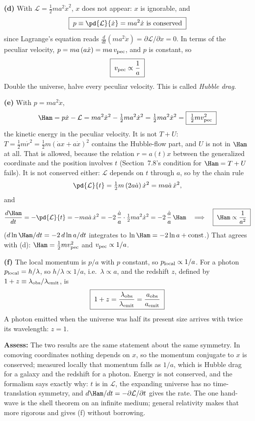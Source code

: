 \documentclass[12pt]{article}
\numberwithin{equation}{section}
\newcommand{\Lag}{\mathcal{L}}
\newcommand{\vpec}{v_{\rm pec}}
\begin{document}
\medskip
\noindent\textbf{(d)} With $\Lag = \tfrac12 m a^2\dot x^2$, $x$ does not appear: $x$ is ignorable, and
\[
  \boxed{\; p \equiv \pd{\Lag}{\dot x} = m a^2\dot x \text{ is conserved} \;}
\]
since Lagrange's equation reads $\frac{d}{dt}(m a^2\dot x) = \partial\Lag/\partial x = 0$.
In terms of the peculiar velocity, $p = m a\,(a\dot x) = m a\,\vpec$, and $p$ is constant, so
\[
  \boxed{\;\vpec \propto \frac1a\;}
\]
Double the universe, halve every peculiar velocity. This is called \emph{Hubble drag}.

\medskip
\noindent\textbf{(e)} With $p = m a^2\dot x$,
\[
  \Ham = p\dot x - \Lag = m a^2\dot x^2 - \tfrac12 m a^2\dot x^2 = \tfrac12 m a^2\dot x^2
  = \boxed{\;\tfrac12 m\vpec^2\;}
\]
the kinetic energy in the peculiar velocity. It is not $T + U$: $T = \tfrac12 m\dot r^2 =
\tfrac12 m(\dot a x + a\dot x)^2$ contains the Hubble-flow part, and $U$ is not in $\Ham$ at all.
That is allowed, because the relation $r = a(t)x$ between the generalized coordinate and the
position involves $t$ (Section~7.8's condition for $\Ham = T + U$ fails). It is not conserved
either: $\Lag$ depends on $t$ through $a$, so by the chain rule
\[
  \pd{\Lag}{t} = \tfrac12 m\,(2a\dot a)\,\dot x^2 = m a\dot a\,\dot x^2 ,
\]
and
\[
  \frac{d\Ham}{dt} = -\pd{\Lag}{t} = -m a\dot a\,\dot x^2 = -2\,\frac{\dot a}{a}\cdot\tfrac12 m a^2\dot x^2
  = -2\,\frac{\dot a}{a}\,\Ham
  \quad\Longrightarrow\quad \boxed{\;\Ham \propto \frac1{a^2}\;}
\]
($d\ln\Ham/dt = -2\,d\ln a/dt$ integrates to $\ln\Ham = -2\ln a + \text{const}$.) That agrees
with (d): $\Ham = \tfrac12 m\vpec^2$ and $\vpec \propto 1/a$.

\medskip
\noindent\textbf{(f)} The local momentum is $p/a$ with $p$ constant, so $p_{\rm local} \propto 1/a$. For
a photon $p_{\rm local} = h/\lambda$, so $h/\lambda \propto 1/a$, i.e.\ $\lambda \propto a$, and the redshift
$z$, defined by $1 + z \equiv \lambda_{\rm obs}/\lambda_{\rm emit}$, is
\[
  \boxed{\;1 + z = \frac{\lambda_{\rm obs}}{\lambda_{\rm emit}} = \frac{a_{\rm obs}}{a_{\rm emit}}\;}
\]
A photon emitted when the universe was half its present size arrives with twice its wavelength:
$z = 1$.

\medskip
\noindent\textbf{Assess:} The two results are the same statement about the same symmetry. In comoving
coordinates nothing depends on $x$, so the momentum conjugate to $x$ is conserved; measured
locally that momentum falls as $1/a$, which is Hubble drag for a galaxy and the redshift for a
photon. Energy is not conserved, and the formalism says exactly why: $t$ is in $\Lag$, the
expanding universe has no time-translation symmetry, and $d\Ham/dt = -\partial\Lag/\partial t$
gives the rate. The one hand-wave is the shell theorem on an infinite medium; general relativity
makes that more rigorous and gives (f) without borrowing.
\fi
\fi   %
\end{document}
